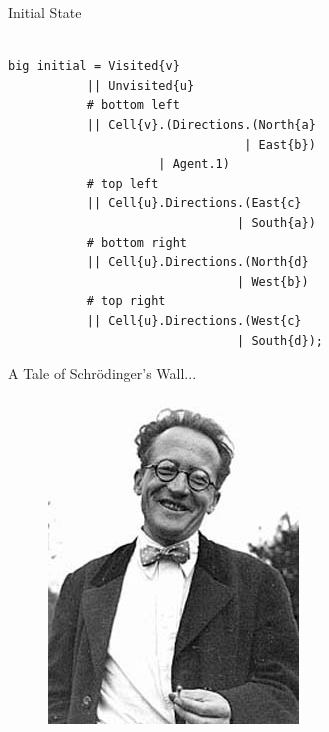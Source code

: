 \documentclass{beamer}
\makeatletter
\providecommand\longrightarrowRHD{\relbar\joinrel\relbar\joinrel\mathrel\RHD}
\providecommand*\xrightarrowRHD[2][]{\ext@arrow 0055{\arrowfill@\relbar\relbar\longrightarrowRHD}{#1}{#2}}
\makeatother
\begin{document}
\begin{frame}[fragile]{Initial State}
\begin{lstlisting}

big initial = Visited{v}
           || Unvisited{u}
           # bottom left
           || Cell{v}.(Directions.(North{a}
                                 | East{b})
                     | Agent.1)
           # top left
           || Cell{u}.Directions.(East{c}
                                | South{a})
           # bottom right
           || Cell{u}.Directions.(North{d}
                                | West{b})
           # top right
           || Cell{u}.Directions.(West{c}
                                | South{d});

\end{lstlisting}
\end{frame}


\begin{frame}{A Tale of Schr\"{o}dinger's Wall...}
  \begin{figure}
    \centering
    \includegraphics[height=\textheight]{schrodinger.jpg}
  \end{figure}
\end{frame}
\end{document}
